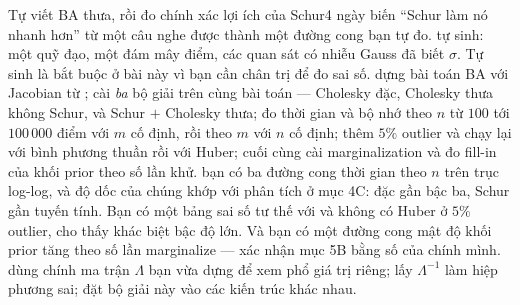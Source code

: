 \documentclass[../../vslam.tex]{subfiles}
\begin{document}
\begin{duan}{Tự viết BA thưa, rồi đo chính xác lợi ích của Schur}{4 ngày}
\dmt biến ``Schur làm nó nhanh hơn'' từ một câu nghe được thành một đường cong bạn tự đo.
\ddl tự sinh: một quỹ đạo, một đám mây điểm, các quan sát có nhiễu Gauss đã biết \(\sigma\). Tự sinh là bắt buộc ở bài này vì bạn cần chân trị để đo sai số.
\dbc dựng bài toán BA với Jacobian từ ; cài \emph{ba} bộ giải trên cùng bài toán --- Cholesky đặc, Cholesky thưa không Schur, và Schur \(+\) Cholesky thưa; đo thời gian và bộ nhớ theo \(n\) từ \(100\) tới \(100\,000\) điểm với \(m\) cố định, rồi theo \(m\) với \(n\) cố định; thêm \(5\%\) outlier và chạy lại với bình phương thuần rồi với Huber; cuối cùng cài marginalization và đo fill-in của khối prior theo số lần khử.
\dxk bạn có ba đường cong thời gian theo \(n\) trên trục log-log, và độ dốc của chúng khớp với phân tích ở mục 4C: đặc gần bậc ba, Schur gần tuyến tính. Bạn có một bảng sai số tư thế với và không có Huber ở \(5\%\) outlier, cho thấy khác biệt bậc độ lớn. Và bạn có một đường cong mật độ khối prior tăng theo số lần marginalize --- xác nhận mục 5B bằng số của chính mình.
\dnv {} dùng chính ma trận \(\Lambda\) bạn vừa dựng để xem phổ giá trị riêng;  lấy \(\Lambda^{-1}\) làm hiệp phương sai;  đặt bộ giải này vào các kiến trúc khác nhau.
\end{duan}
\end{document}
